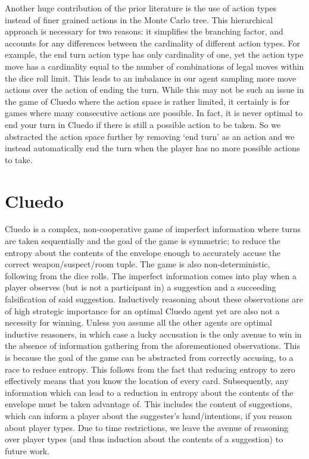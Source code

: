 \documentclass[a4paper,12pt]{proposal}
\begin{document}
Another huge contribution of the prior literature is the use of action types instead of finer grained actions in the Monte Carlo tree. This hierarchical approach is necessary for two reasons: it simplifies the branching factor, and accounts for any differences between the cardinality of different action types. For example, the end turn action type has only cardinality of one, yet the action type move has a cardinality equal to the number of combinations of legal moves within the dice roll limit. This leads to an imbalance in our agent sampling more move actions over the action of ending the turn. While this may not be such an issue in the game of Cluedo where the action space is rather limited, it certainly is for games where many consecutive actions are possible. In fact, it is never optimal to end your turn in Cluedo if there is still a possible action to be taken. So we abstracted the action space further by removing ‘end turn’ as an action and we instead automatically end the turn when the player has no more possible actions to take.

\section{Cluedo}
Cluedo is a complex, non-cooperative game of imperfect information where turns are taken sequentially and the goal of the game is symmetric; to reduce the entropy about the contents of the envelope enough to accurately accuse the correct weapon/suspect/room tuple. The game is also non-deterministic, following from the dice rolls. The imperfect information comes into play when a player observes (but is not a participant in) a suggestion and a succeeding falsification of said suggestion. Inductively reasoning about these observations are of high strategic importance for an optimal Cluedo agent yet are also not a necessity for winning. Unless you assume all the other agents are optimal inductive reasoners, in which case a lucky accusation is the only avenue to win in the absence of information gathering from the aforementioned observations. This is because the goal of the game can be abstracted from correctly accusing, to a race to reduce entropy. This follows from the fact that reducing entropy to zero effectively means that you know the location of every card. Subsequently, any information which can lead to a reduction in entropy about the contents of the envelope must be taken advantage of. This includes the content of suggestions, which can inform a player about the suggester’s hand/intentions, if you reason about player types. Due to time restrictions, we leave the avenue of reasoning over player types (and thus induction about the contents of a suggestion) to future work. 
\end{document}
